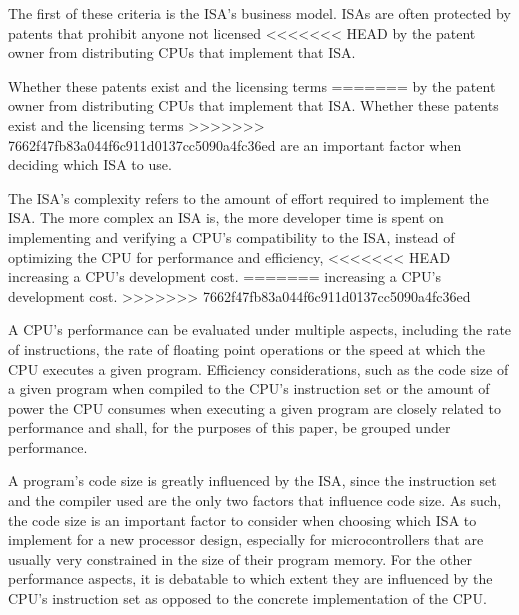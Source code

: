 \documentclass[conference]{IEEEtran}
\begin{document}
The first of these criteria is the \gls{ISA}'s business model. \glspl{ISA} are often protected by patents that prohibit anyone not licensed
<<<<<<< HEAD
by the patent owner from distributing \glspl{CPU} that implement that \gls{ISA}. \cite{Tang2011}

Whether these patents exist and the licensing terms
=======
by the patent owner from distributing \glspl{CPU} that implement that \gls{ISA}. \cite{Tang2011} Whether these patents exist and the licensing terms
>>>>>>> 7662f47fb83a044f6c911d0137cc5090a4fc36ed
are an important factor when deciding which \gls{ISA} to use.

The \gls{ISA}'s complexity refers to the amount of effort required to implement the \gls{ISA}. The more complex an \gls{ISA} is, the more developer
time is spent on implementing and verifying a \gls{CPU}'s compatibility to the \gls{ISA}, instead of optimizing the \gls{CPU} for performance and efficiency,
<<<<<<< HEAD
increasing a \gls{CPU}'s development cost. \cite{Patterson1980}
=======
increasing a \gls{CPU}'s development cost.
>>>>>>> 7662f47fb83a044f6c911d0137cc5090a4fc36ed

A \gls{CPU}'s performance can be evaluated under multiple aspects, including the rate of instructions, the rate of floating point operations or
the speed at which the CPU executes a given program. Efficiency considerations, such as the code size of a given program when compiled to the \gls{CPU}'s
instruction set or the amount of power the \gls{CPU} consumes when executing a given program are closely related to performance and shall, for the
purposes of this paper, be grouped under performance.

A program's code size is greatly influenced by the \gls{ISA}, since the instruction set and the compiler used are the only two factors that influence
code size. As such, the code size is an important factor to consider when choosing which \gls{ISA} to implement for a new processor design, especially
for microcontrollers that are usually very constrained in the size of their program memory.
For the other performance aspects, it is debatable to which extent they are influenced by the \gls{CPU}'s instruction set as opposed
to the concrete implementation of the CPU. \cite{Blem2013} \cite{Akram2017}
\end{document}
